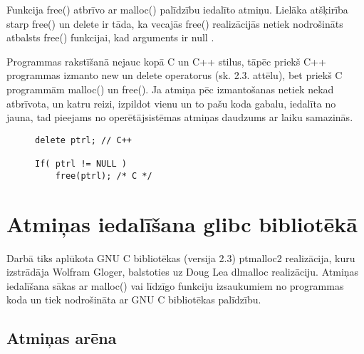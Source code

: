 Funkcija free() atbrīvo ar malloc() palīdzību iedalīto atmiņu.
Lielāka atšķirība starp free() un delete ir tāda, ka vecajās free() realizācijās netiek nodrošināts atbalsts free() funkcijai, kad arguments ir null \cite{POCF}. 

Programmas rakstīšanā nejauc kopā C un C++ stilus, tāpēc priekš C++ programmas izmanto 
new un delete operatorus (sk. 2.3. attēlu), bet priekš C programmām malloc() un free().
Ja atmiņa pēc izmantošanas netiek nekad atbrīvota, un katru reizi, izpildot vienu un to pašu koda gabalu, iedalīta no jauna, tad pieejams no operētājsistēmas atmiņas daudzums ar laiku samazinās.


\begin{figure}[h]
\begin{lstlisting}
delete ptrl; // C++

If( ptrl != NULL )
	free(ptrl); /* C */
\end{lstlisting}
\caption{\textbf{\fontsize{11}{12}\selectfont {Dinamiskās atmiņas atbrīvošana C un C++}}}
\end{figure}








\section{Atmiņas iedalīšana glibc bibliotēkā}
Darbā tiks aplūkota GNU C bibliotēkas (versija 2.3) ptmalloc2 realizācija, kuru izstrādāja Wolfram Gloger, balstoties uz Doug Lea dlmalloc realizāciju. 
Atmiņas iedalīšana sākas ar malloc() vai līdzīgo funkciju izsaukumiem no programmas koda un tiek nodrošināta ar GNU C bibliotēkas palīdzību. 




\subsection{Atmiņas arēna}

